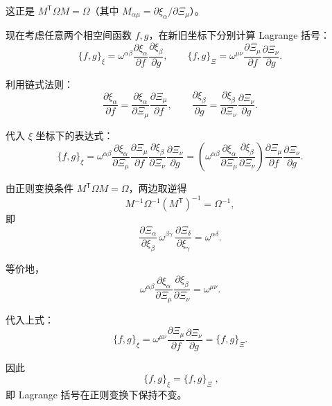 \begin{question}
\begin{solution}
这正是 \(M^\mathsf T \Omega M = \Omega\)（其中 \(M_{\alpha\mu} = \partial\xi_\alpha/\partial\Xi_\mu\)）。

现在考虑任意两个相空间函数 \(f,g\)，在新旧坐标下分别计算 Lagrange 括号：
\[
\{f,g\}_\xi = \omega^{\alpha\beta}\frac{\partial\xi_\alpha}{\partial f}
\frac{\partial\xi_\beta}{\partial g},
\qquad
\{f,g\}_\Xi = \omega^{\mu\nu}\frac{\partial\Xi_\mu}{\partial f}
\frac{\partial\Xi_\nu}{\partial g}.
\]

利用链式法则：
\[
\frac{\partial\xi_\alpha}{\partial f}
= \frac{\partial\xi_\alpha}{\partial\Xi_\mu}\frac{\partial\Xi_\mu}{\partial f},
\qquad
\frac{\partial\xi_\beta}{\partial g}
= \frac{\partial\xi_\beta}{\partial\Xi_\nu}\frac{\partial\Xi_\nu}{\partial g}.
\]

代入 \(\xi\) 坐标下的表达式：
\[
\{f,g\}_\xi = \omega^{\alpha\beta}
\frac{\partial\xi_\alpha}{\partial\Xi_\mu}\frac{\partial\Xi_\mu}{\partial f}
\frac{\partial\xi_\beta}{\partial\Xi_\nu}\frac{\partial\Xi_\nu}{\partial g}
= \left(
\omega^{\alpha\beta}\frac{\partial\xi_\alpha}{\partial\Xi_\mu}
\frac{\partial\xi_\beta}{\partial\Xi_\nu}
\right)
\frac{\partial\Xi_\mu}{\partial f}\frac{\partial\Xi_\nu}{\partial g}.
\]

由正则变换条件 \(M^\mathsf T\Omega M = \Omega\)，两边取逆得
\[
M^{-1}\Omega^{-1}(M^\mathsf T)^{-1} = \Omega^{-1},
\]
即
\[
\frac{\partial\Xi_\alpha}{\partial\xi_\beta}\,
\omega^{\beta\gamma}\,
\frac{\partial\Xi_\delta}{\partial\xi_\gamma}
= \omega^{\alpha\delta}.
\]

等价地，
\[
\omega^{\alpha\beta}\frac{\partial\xi_\alpha}{\partial\Xi_\mu}
\frac{\partial\xi_\beta}{\partial\Xi_\nu} = \omega^{\mu\nu}.
\]

代入上式：
\[
\{f,g\}_\xi = \omega^{\mu\nu}
\frac{\partial\Xi_\mu}{\partial f}\frac{\partial\Xi_\nu}{\partial g}
= \{f,g\}_\Xi.
\]

因此
\[
\boxed{\;\{f,g\}_\xi = \{f,g\}_\Xi\;},
\]
即 Lagrange 括号在正则变换下保持不变。
\end{solution}
\end{question}

